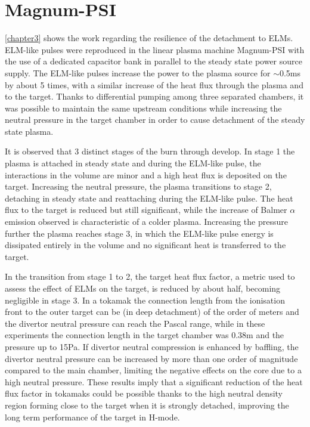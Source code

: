 \section{Magnum-PSI}

\autoref{chapter3} shows the work regarding the resilience of the detachment to ELMs. ELM-like pulses were reproduced in the linear plasma machine Magnum-PSI with the use of a dedicated capacitor bank in parallel to the steady state power source supply. The ELM-like pulses increase the power to the plasma source for $\sim$0.5ms by about 5 times, with a similar increase of the heat flux through the plasma and to the target. Thanks to differential pumping among three separated chambers, it was possible to maintain the same upstream conditions while increasing the neutral pressure in the target chamber in order to cause detachment of the steady state plasma.

It is observed that 3 distinct stages of the burn through develop. In stage 1 the plasma is attached in steady state and during the ELM-like pulse, the interactions in the volume are minor and a high heat flux is deposited on the target. Increasing the neutral pressure, the plasma transitions to stage 2, detaching in steady state and reattaching during the ELM-like pulse. The heat flux to the target is reduced but still significant, while the increase of Balmer $\alpha$ emission observed is characteristic of a colder plasma. Increasing the pressure further the plasma reaches stage 3, in which the ELM-like pulse energy is dissipated entirely in the volume and no significant heat is transferred to the target.

In the transition from stage 1 to 2, the target heat flux factor, a metric used to assess the effect of ELMs on the target, is reduced by about half, becoming negligible in stage 3. In a tokamak the connection length from the ionisation front to the outer target can be (in deep detachment) of the order of meters and the divertor neutral pressure can reach the Pascal range, while in these experiments the connection length in the target chamber was 0.38m and the pressure up to 15Pa. If divertor neutral compression is enhanced by baffling, the divertor neutral pressure can be increased by more than one order of magnitude compared to the main chamber, limiting the negative effects on the core due to a high neutral pressure. These results imply that a significant reduction of the heat flux factor in tokamaks could be possible thanks to the high neutral density region forming close to the target when it is strongly detached, improving the long term performance of the target in H-mode. 

